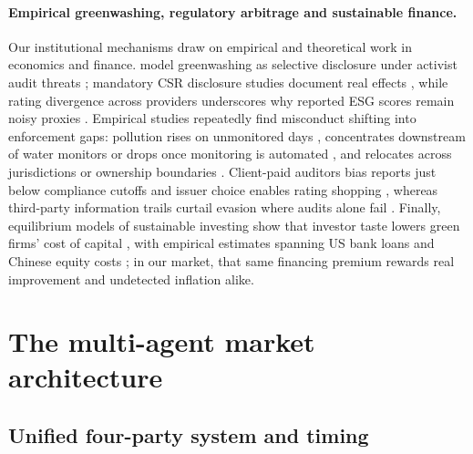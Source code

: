 \documentclass[11pt]{article}
\begin{document}
\paragraph{Empirical greenwashing, regulatory arbitrage and sustainable finance.}
Our institutional mechanisms draw on empirical and theoretical work in economics and finance. \citet{lyon2011greenwash} model greenwashing as selective disclosure under activist audit threats \citep[see also][]{delmas2011drivers,lyon2015means,kim2015greenwash,marquis2016scrutiny}; mandatory CSR disclosure studies document real effects \citep{christensen2021mandatory,chen2018effect,fiechter2022real}, while rating divergence across providers underscores why reported ESG scores remain noisy proxies \citep{berg2022aggregate}. Empirical studies repeatedly find misconduct shifting into enforcement gaps: pollution rises on unmonitored days \citep{zou2021unwatched}, concentrates downstream of water monitors \citep{he2020watering} or drops once monitoring is automated \citep{greenstone2022technology}, and relocates across jurisdictions or ownership boundaries \citep{bartram2022real,duchin2025sustainability}. Client-paid auditors bias reports just below compliance cutoffs \citep{duflo2013truth} and issuer choice enables rating shopping \citep{skreta2009ratings,bolton2012credit}, whereas third-party information trails curtail evasion where audits alone fail \citep{kleven2011unwilling,pomeranz2015taxation}. Finally, equilibrium models of sustainable investing show that investor taste lowers green firms' cost of capital \citep{heinkel2001effect,pastor2021sustainable,pedersen2021responsible}, with empirical estimates spanning US bank loans \citep{goss2011impact} and Chinese equity costs \citep{zhao2024esg,easton2004pe}; in our market, that same financing premium rewards real improvement and undetected inflation alike.

\section{The multi-agent market architecture}\label{sec:model}

\subsection{Unified four-party system and timing}
\end{document}
